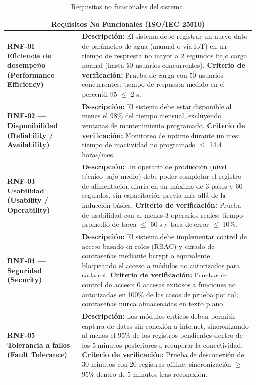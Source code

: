 \documentclass[11pt,a4paper]{article}
\begin{document}
\begin{longtable}{|p{3.5cm}|p{12cm}|}
\caption{Requisitos no funcionales del sistema.}
\label{tab:rnf} \\
\hline

\multicolumn{2}{|c|}{\textbf{Requisitos No Funcionales (ISO/IEC 25010)}} \\ \hline

\textbf{RNF-01 — Eficiencia de desempeño (Performance Efficiency)} &
\textbf{Descripción:} El sistema debe registrar un nuevo dato de parámetro de agua (manual o vía IoT) en un tiempo de respuesta no mayor a 2 segundos bajo carga normal (hasta 50 usuarios concurrentes). \newline
\textbf{Criterio de verificación:} Prueba de carga con 50 usuarios concurrentes; tiempo de respuesta medido en el percentil 95 $ \leq $ 2 s. \\ \hline

\textbf{RNF-02 — Disponibilidad (Reliability / Availability)} &
\textbf{Descripción:} El sistema debe estar disponible al menos el 98\% del tiempo mensual, excluyendo ventanas de mantenimiento programado. \newline
\textbf{Criterio de verificación:} Monitoreo de uptime durante un mes; tiempo de inactividad no programado $ \leq $ 14.4 horas/mes. \\ \hline

\textbf{RNF-03 — Usabilidad (Usability / Operability)} &
\textbf{Descripción:} Un operario de producción (nivel técnico bajo-medio) debe poder completar el registro de alimentación diaria en un máximo de 3 pasos y 60 segundos, sin capacitación previa más allá de la inducción básica. \newline
\textbf{Criterio de verificación:} Prueba de usabilidad con al menos 3 operarios reales; tiempo promedio de tarea $ \leq $ 60 s y tasa de error $ \leq $ 10\%. \\ \hline

\textbf{RNF-04 — Seguridad (Security)} &
\textbf{Descripción:} El sistema debe implementar control de acceso basado en roles (RBAC) y cifrado de contraseñas mediante bcrypt o equivalente, bloqueando el acceso a módulos no autorizados para cada rol. \newline
\textbf{Criterio de verificación:} Pruebas de control de acceso: 0 accesos exitosos a funciones no autorizadas en 100\% de los casos de prueba por rol; contraseñas nunca almacenadas en texto plano. \\ \hline

\textbf{RNF-05 — Tolerancia a fallos (Fault Tolerance)} &
\textbf{Descripción:} Los módulos críticos deben permitir captura de datos sin conexión a internet, sincronizando al menos el 95\% de los registros pendientes dentro de los 5 minutos posteriores a recuperar la conectividad. \newline
\textbf{Criterio de verificación:} Prueba de desconexión de 30 minutos con 20 registros offline; sincronización $ \geq $ 95\% dentro de 5 minutos tras reconexión. \\ \hline


\end{longtable}
\end{document}
